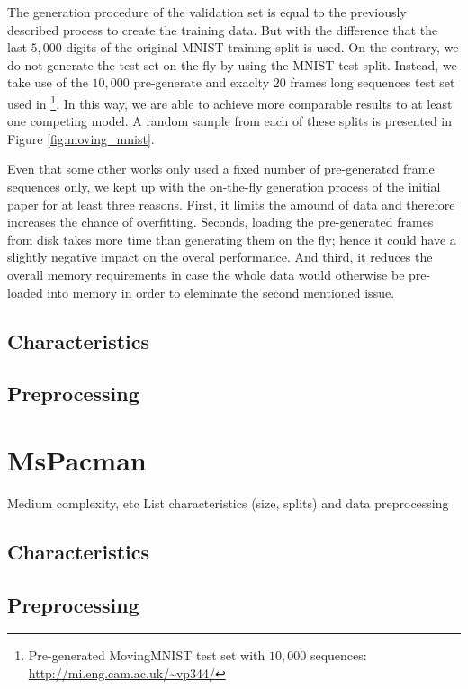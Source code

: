The generation procedure of the validation set is equal to the previously described process to create the training data. But with the difference that the last $5,000$ digits of the original MNIST training split is used. On the contrary, we do not generate the test set on the fly by using the MNIST test split. Instead, we take use of the $10,000$ pre-generate and exaclty $20$ frames long sequences test set used in \parencite{spat_temp_video_autoenc}\footnote{Pre-generated MovingMNIST test set with $10,000$ sequences: \url{http://mi.eng.cam.ac.uk/~vp344/}}. In this way, we are able to achieve more comparable results to at least one competing model. A random sample from each of these splits is presented in Figure \ref{fig:moving_mnist}.

Even that some other works only used a fixed number of pre-generated frame sequences only, we kept up with the on-the-fly generation process of the initial paper for at least three reasons. First, it limits the amound of data and therefore increases the chance of overfitting. Seconds, loading the pre-generated frames from disk takes more time than generating them on the fly; hence it could have a slightly negative impact on the overal performance. And third, it reduces the overall memory requirements in case the whole data would otherwise be pre-loaded into memory in order to eleminate the second mentioned issue.

\subsection*{Characteristics}
\subsection*{Preprocessing}

\section{MsPacman}

Medium complexity, etc
List characteristics (size, splits) and data preprocessing
\subsection*{Characteristics}
\subsection*{Preprocessing}

